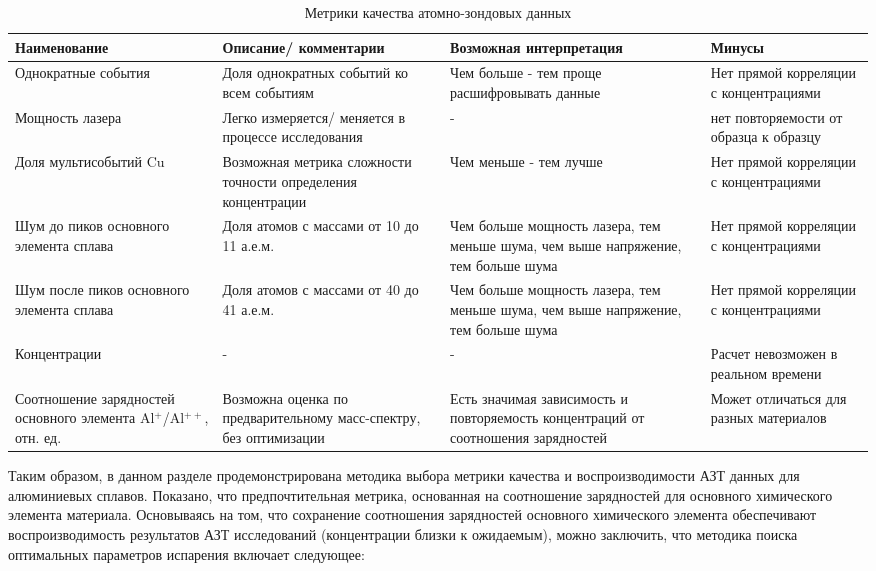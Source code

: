 \begin{table} [htb]
	\centering
	\caption{Метрики качества атомно-зондовых данных}
	\label{tab:params_expl}
	\begin{SingleSpace}
		\begin{tabularx}{\textwidth} {| X | X | X | X |}
			\hline
			Наименование & Описание/ комментарии & Возможная интерпретация & Минусы  \\ \hline
			Однократные события & {Доля однократных событий ко всем событиям}  & {Чем больше - тем проще расшифровывать данные}  & {Нет прямой корреляции с концентрациями}              \\ \hline
			Мощность лазера & {Легко измеряется/ меняется в процессе исследования}  & {-}  & {нет повторяемости от образца к образцу}              \\ \hline
			Доля мультисобытий Cu & Возможная метрика сложности точности определения концентрации & Чем меньше - тем лучше & Нет прямой корреляции с концентрациями          \\ \hline		
			Шум до пиков основного элемента сплава      & Доля атомов с массами от 10 до 11 а.е.м. & Чем больше мощность лазера, тем меньше шума, чем выше напряжение, тем больше шума  & Нет прямой корреляции с концентрациями               \\ \hline
			Шум после пиков основного элемента сплава     & Доля атомов с массами от 40 до 41 а.е.м. & Чем больше мощность лазера, тем меньше шума, чем выше напряжение, тем больше шума  & Нет прямой корреляции с концентрациями             \\ \hline
			Концентрации  & -   &  -   & Расчет невозможен в реальном времени  \\ \hline			
			Соотношение зарядностей основного элемента Al$^+$/Al$^{++}$, отн. ед.    & Возможна оценка по предварительному масс-спектру, без оптимизации   & Есть значимая зависимость и повторяемость концентраций от соотношения зарядностей  & Может отличаться для разных материалов   \\ \hline
		\end{tabularx}
	\end{SingleSpace}
\end{table}

\FloatBarrier
Таким образом, в данном разделе продемонстрирована методика выбора метрики качества и воспроизводимости АЗТ данных для алюминиевых сплавов. Показано, что предпочтительная метрика, основанная на соотношение зарядностей для основного химического элемента материала. Основываясь на том, что сохранение соотношения зарядностей основного химического элемента обеспечивают воспроизводимость результатов АЗТ исследований (концентрации близки к ожидаемым), можно заключить, что методика поиска оптимальных параметров испарения включает следующее:

